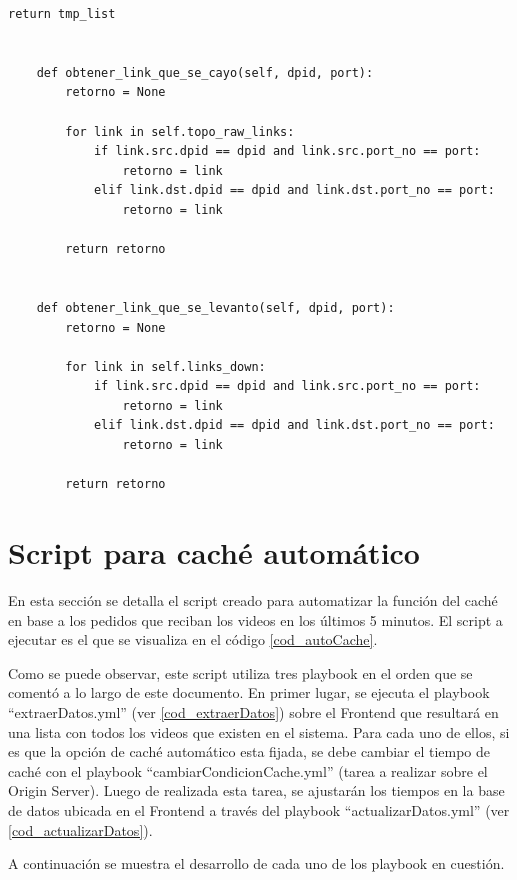 \documentclass[12pt,a4paper,oneside]{book}
\begin{document}
\begin{lstlisting}[style=codigobase,  label = cod_correrP, caption= controlador.py]
        return tmp_list


    def obtener_link_que_se_cayo(self, dpid, port):
        retorno = None

        for link in self.topo_raw_links:
            if link.src.dpid == dpid and link.src.port_no == port:
                retorno = link
            elif link.dst.dpid == dpid and link.dst.port_no == port:
                retorno = link

        return retorno


    def obtener_link_que_se_levanto(self, dpid, port):
        retorno = None

        for link in self.links_down:
            if link.src.dpid == dpid and link.src.port_no == port:
                retorno = link
            elif link.dst.dpid == dpid and link.dst.port_no == port:
                retorno = link

        return retorno
\end{lstlisting}


\section{Script para caché automático}
\label{seccC.2}
En esta sección se detalla el script creado para automatizar la función del caché en base a los pedidos que reciban los videos en los últimos 5 minutos. El script a ejecutar es el que se visualiza en el código \ref{cod_autoCache}.

\vspace{0.5cm}

Como se puede observar, este script utiliza tres playbook en el orden que se comentó a lo largo de este documento. En primer lugar, se ejecuta el playbook ``extraerDatos.yml'' (ver \ref{cod_extraerDatos}) sobre el Frontend que resultará en una lista con todos los videos que existen en el sistema. Para cada uno de ellos, si es que la opción de caché automático esta fijada, se debe cambiar el tiempo de caché con el playbook ``cambiarCondicionCache.yml'' (tarea a realizar sobre el Origin Server). Luego de realizada esta tarea, se ajustarán los tiempos en la base de datos ubicada en el Frontend a través del playbook ``actualizarDatos.yml'' (ver \ref{cod_actualizarDatos}).

\vspace{0.5cm}

A continuación se muestra el desarrollo de cada uno de los playbook en cuestión.


\vspace{0.5cm}
\end{document}
